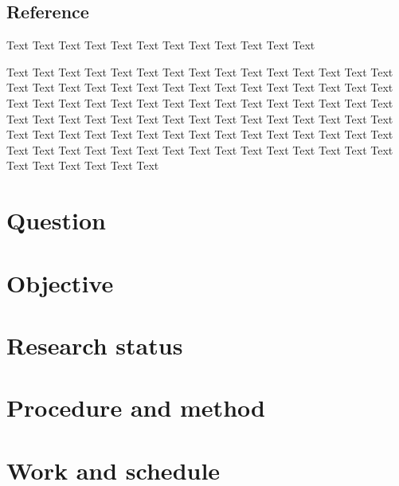 \documentclass[a4paper, 12pt]{scrartcl}
\begin{document}
\subsection{Reference}
Text Text Text Text Text Text Text Text Text Text Text Text

Text Text Text Text Text Text Text Text Text Text Text Text Text Text Text Text Text Text Text Text Text Text Text Text Text Text Text Text Text Text Text Text Text Text Text Text Text Text Text Text Text Text Text Text Text Text Text Text Text Text Text Text Text Text Text Text Text Text Text Text Text Text Text Text Text Text Text Text Text Text Text Text Text Text Text Text Text Text Text Text Text Text Text Text Text Text Text Text Text Text Text Text Text Text Text Text

\section{Question}
\lipsum[1]

\section{Objective}
\section{Research status}
\section{Procedure and method}
\section{Work and schedule}

\end{document}
